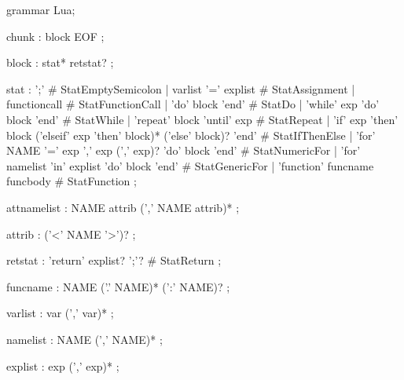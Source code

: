 grammar Lua;

chunk
    : block EOF
    ;

block
    : stat* retstat?
    ;

stat
    : ';'                                                                           # StatEmptySemicolon
    | varlist '=' explist                                                           # StatAssignment
    | functioncall                                                                  # StatFunctionCall
    | 'do' block 'end'                                                              # StatDo
    | 'while' exp 'do' block 'end'                                                  # StatWhile
    | 'repeat' block 'until' exp                                                    # StatRepeat
    | 'if' exp 'then' block ('elseif' exp 'then' block)* ('else' block)? 'end'      # StatIfThenElse
    | 'for' NAME '=' exp ',' exp (',' exp)? 'do' block 'end'                        # StatNumericFor
    | 'for' namelist 'in' explist 'do' block 'end'                                  # StatGenericFor
    | 'function' funcname funcbody                                                  # StatFunction
    ;

attnamelist
    : NAME attrib (',' NAME attrib)*
    ;

attrib
    : ('<' NAME '>')?
    ;

retstat
    : 'return' explist? ';'?                                                        # StatReturn
    ;

funcname
    : NAME ('.' NAME)* (':' NAME)?
    ;

varlist
    : var (',' var)*
    ;

namelist
    : NAME (',' NAME)*
    ;

explist
    : exp (',' exp)*
    ;

